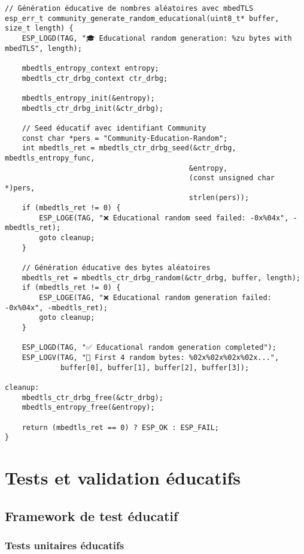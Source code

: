 \begin{lstlisting}[caption={Optimisations éducatives avec mbedTLS}]
// Génération éducative de nombres aléatoires avec mbedTLS
esp_err_t community_generate_random_educational(uint8_t* buffer, size_t length) {
    ESP_LOGD(TAG, "🎓 Educational random generation: %zu bytes with mbedTLS", length);
    
    mbedtls_entropy_context entropy;
    mbedtls_ctr_drbg_context ctr_drbg;
    
    mbedtls_entropy_init(&entropy);
    mbedtls_ctr_drbg_init(&ctr_drbg);
    
    // Seed éducatif avec identifiant Community
    const char *pers = "Community-Education-Random";
    int mbedtls_ret = mbedtls_ctr_drbg_seed(&ctr_drbg, mbedtls_entropy_func, 
                                           &entropy, 
                                           (const unsigned char *)pers, 
                                           strlen(pers));
    if (mbedtls_ret != 0) {
        ESP_LOGE(TAG, "❌ Educational random seed failed: -0x%04x", -mbedtls_ret);
        goto cleanup;
    }
    
    // Génération éducative des bytes aléatoires
    mbedtls_ret = mbedtls_ctr_drbg_random(&ctr_drbg, buffer, length);
    if (mbedtls_ret != 0) {
        ESP_LOGE(TAG, "❌ Educational random generation failed: -0x%04x", -mbedtls_ret);
        goto cleanup;
    }
    
    ESP_LOGD(TAG, "✅ Educational random generation completed");
    ESP_LOGV(TAG, "🎲 First 4 random bytes: %02x%02x%02x%02x...", 
             buffer[0], buffer[1], buffer[2], buffer[3]);

cleanup:
    mbedtls_ctr_drbg_free(&ctr_drbg);
    mbedtls_entropy_free(&entropy);
    
    return (mbedtls_ret == 0) ? ESP_OK : ESP_FAIL;
}
\end{lstlisting}

\section{Tests et validation éducatifs}

\subsection{Framework de test éducatif}

\subsubsection{Tests unitaires éducatifs}

